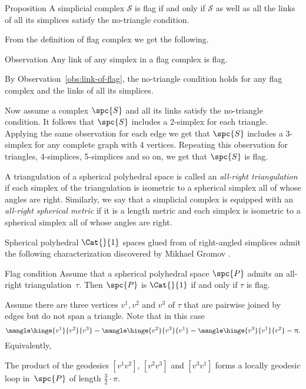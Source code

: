 \begin{thm}{Proposition}\label{prop:no-trig}
A simplicial complex $\mathcal{S}$ is flag if and only if 
$\mathcal{S}$ as well as all the links of all its simplices
satisfy the no-triangle condition.
\end{thm}

From the definition of flag complex 
we get the following.

\begin{thm}{Observation}\label{obs:link-of-flag}
Any link of any simplex in a flag complex is flag.
\end{thm}


By Observation~\ref{obs:link-of-flag}, the no-triangle condition holds 
for any flag complex and the  links of all its simplices.

Now assume a complex $\spc{S}$ and all its links satisfy 
the no-triangle condition.
It follows that $\spc{S}$ includes a 2-simplex for each triangle.
Applying the same observation for each edge we get that $\spc{S}$ 
includes a 3-simplex for any complete graph with 4 vertices.
Repeating this observation 
for triangles, 
4-simplices,
5-simplices
and so on, we get that $\spc{S}$ is flag.
\qeds


A triangulation of a spherical polyhedral space 
is called an  \emph{all-right triangulation} 
if each simplex of the triangulation is isometric 
to a spherical simplex all of whose angles are right.
Similarly, we say that a simplicial complex 
is equipped with an  \emph{all-right spherical metric}
if it is a length metric and each simplex is isometric 
to a spherical simplex all of whose angles are right.

Spherical polyhedral $\Cat{}{1}$ spaces glued from of right-angled simplices
admit the following characterization 
discovered by Mikhael Gromov \cite[p. 122]{gromov:hyp-groups}.

\begin{thm}{Flag condition}\label{thm:flag}
Assume that a spherical polyhedral space $\spc{P}$
admits an all-right triangulation~$\tau$.
Then $\spc{P}$ is $\Cat{}{1}$
if and only if $\tau$ is flag.
\end{thm}

Assume there are three vertices $v^1,v^2$ and $v^3$ of $\tau$
that are pairwise joined by edges 
but do not span a triangle.
Note that in this case 
\[
\mangle\hinge{v^1}{v^2}{v^3}=
\mangle\hinge{v^2}{v^3}{v^1}=
\mangle\hinge{v^3}{v^1}{v^2}=
\pi.
\]
Equivalently,
\begin{clm}{}\label{clm:3pi/2}
The product
of the geodesics $[v^1v^2]$, $[v^2v^3]$ and $[v^3v^1]$
forms a locally geodesic loop in~$\spc{P}$ of length $\tfrac32\cdot\pi$.
\end{clm}

